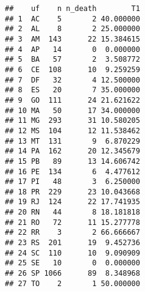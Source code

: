 \documentclass[
]{article}
\newenvironment{Shaded}{\begin{snugshade}}{\end{snugshade}}
\newcommand{\AttributeTok}[1]{\textcolor[rgb]{0.77,0.63,0.00}{#1}}
\newcommand{\DecValTok}[1]{\textcolor[rgb]{0.00,0.00,0.81}{#1}}
\newcommand{\FunctionTok}[1]{\textcolor[rgb]{0.00,0.00,0.00}{#1}}
\newcommand{\NormalTok}[1]{#1}
\newcommand{\OtherTok}[1]{\textcolor[rgb]{0.56,0.35,0.01}{#1}}
\newcommand{\SpecialCharTok}[1]{\textcolor[rgb]{0.00,0.00,0.00}{#1}}
\newcommand{\StringTok}[1]{\textcolor[rgb]{0.31,0.60,0.02}{#1}}
\begin{document}
\begin{Shaded}
\end{Shaded}

\begin{verbatim}
##    uf    n n_death        T1
## 1  AC    5       2 40.000000
## 2  AL    8       2 25.000000
## 3  AM  143      22 15.384615
## 4  AP   14       0  0.000000
## 5  BA   57       2  3.508772
## 6  CE  108      10  9.259259
## 7  DF   32       4 12.500000
## 8  ES   20       7 35.000000
## 9  GO  111      24 21.621622
## 10 MA   50      17 34.000000
## 11 MG  293      31 10.580205
## 12 MS  104      12 11.538462
## 13 MT  131       9  6.870229
## 14 PA  162      20 12.345679
## 15 PB   89      13 14.606742
## 16 PE  134       6  4.477612
## 17 PI   48       3  6.250000
## 18 PR  229      23 10.043668
## 19 RJ  124      22 17.741935
## 20 RN   44       8 18.181818
## 21 RO   72      11 15.277778
## 22 RR    3       2 66.666667
## 23 RS  201      19  9.452736
## 24 SC  110      10  9.090909
## 25 SE   10       0  0.000000
## 26 SP 1066      89  8.348968
## 27 TO    2       1 50.000000
\end{verbatim}
\end{document}
